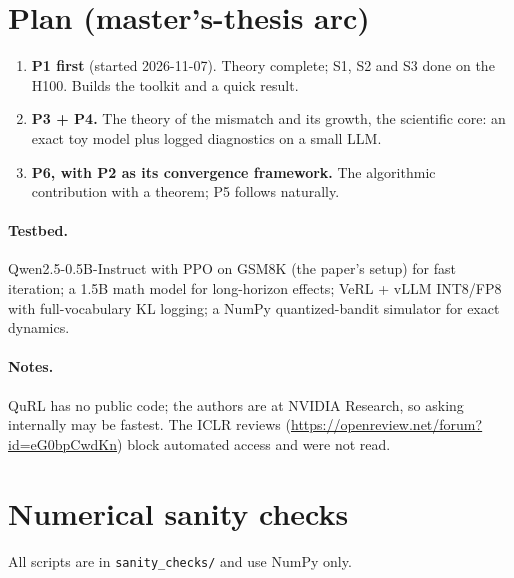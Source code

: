 \documentclass[11pt]{article}
\begin{document}
\section{Plan (master's-thesis arc)}\label{sec:plan}
\begin{enumerate}
\item \textbf{P1 first} (started 2026-11-07). Theory complete; S1, S2 and S3 done on the H100. Builds the toolkit and a quick result.
\item \textbf{P3 + P4.} The theory of the mismatch and its growth, the scientific core: an exact toy model plus logged diagnostics on a small LLM.
\item \textbf{P6, with P2 as its convergence framework.} The algorithmic contribution with a theorem; P5 follows naturally.
\end{enumerate}

\paragraph{Testbed.} Qwen2.5-0.5B-Instruct \citep{qwen2024qwen25} with PPO on GSM8K \citep{cobbe2021gsm8k} (the paper's setup) for fast iteration; a 1.5B math model \citep{yang2024qwen25math,luo2025deepscaler} for long-horizon effects; VeRL \citep{sheng2025hybridflow} + vLLM INT8/FP8 with full-vocabulary KL logging; a NumPy quantized-bandit simulator for exact dynamics.

\paragraph{Notes.} QuRL has no public code; the authors are at NVIDIA Research, so asking internally may be fastest. The ICLR reviews (\url{https://openreview.net/forum?id=eG0bpCwdKn}) block automated access and were not read.

\section{Numerical sanity checks}\label{sec:checks}
All scripts are in \texttt{sanity\_checks/} and use NumPy only.
\end{document}
